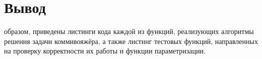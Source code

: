 \section*{Вывод}
 образом, приведены листинги кода каждой из функций, реализующих алгоритмы решения задачи коммивояжёра, а также листинг тестовых функций, направленных на проверку корректности их работы и функции параметризации.
